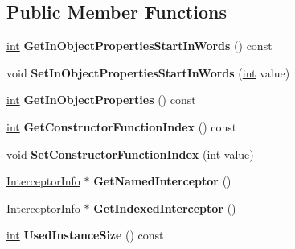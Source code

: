 \subsection*{Public Member Functions}
\begin{DoxyCompactItemize}
\item 
\mbox{\label{classv8_1_1internal_1_1Map_a40442b20a3d67c8cdf6794dc2b6029c4}} 
\mbox{\hyperlink{classint}{int}} {\bfseries Get\+In\+Object\+Properties\+Start\+In\+Words} () const
\item 
\mbox{\label{classv8_1_1internal_1_1Map_adcb508f6f61fe5c69e7f318cc94d39fc}} 
void {\bfseries Set\+In\+Object\+Properties\+Start\+In\+Words} (\mbox{\hyperlink{classint}{int}} value)
\item 
\mbox{\label{classv8_1_1internal_1_1Map_a80c79d46d1295767a0e90dcdd9fd7dcf}} 
\mbox{\hyperlink{classint}{int}} {\bfseries Get\+In\+Object\+Properties} () const
\item 
\mbox{\label{classv8_1_1internal_1_1Map_ad758e96614e4ece4404822bb2ce0a7b8}} 
\mbox{\hyperlink{classint}{int}} {\bfseries Get\+Constructor\+Function\+Index} () const
\item 
\mbox{\label{classv8_1_1internal_1_1Map_a2a3e4023efbd179083831ee45a2377c3}} 
void {\bfseries Set\+Constructor\+Function\+Index} (\mbox{\hyperlink{classint}{int}} value)
\item 
\mbox{\label{classv8_1_1internal_1_1Map_a3135a8c11308d1f9ddc96964f0b6ccf2}} 
\mbox{\hyperlink{classv8_1_1internal_1_1InterceptorInfo}{Interceptor\+Info}} $\ast$ {\bfseries Get\+Named\+Interceptor} ()
\item 
\mbox{\label{classv8_1_1internal_1_1Map_aaedf9196ef3e315f3c5e3895a7b5cbb9}} 
\mbox{\hyperlink{classv8_1_1internal_1_1InterceptorInfo}{Interceptor\+Info}} $\ast$ {\bfseries Get\+Indexed\+Interceptor} ()
\item 
\mbox{\label{classv8_1_1internal_1_1Map_a3046bccba6c04132c281b17e62c7e0bb}} 
\mbox{\hyperlink{classint}{int}} {\bfseries Used\+Instance\+Size} () const

\end{DoxyCompactItemize}
